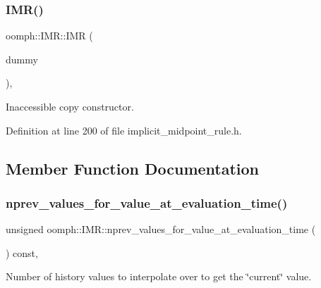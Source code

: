 \subsubsection{\texorpdfstring{I\+M\+R()}{IMR()}\hspace{0.1cm}{\footnotesize\ttfamily [2/2]}}
{\footnotesize\ttfamily oomph\+::\+I\+M\+R\+::\+I\+MR (\begin{DoxyParamCaption}\item[{const \hyperlink{classoomph_1_1IMR}{I\+MR} \&}]{dummy }\end{DoxyParamCaption})\hspace{0.3cm}{\ttfamily [inline]}, {\ttfamily [private]}}



Inaccessible copy constructor. 



Definition at line 200 of file implicit\+\_\+midpoint\+\_\+rule.\+h.



\subsection{Member Function Documentation}
\mbox{\label{classoomph_1_1IMR_a7cfe8ba542880aa524bcb837c1bc86e4}} 
\subsubsection{\texorpdfstring{nprev\+\_\+values\+\_\+for\+\_\+value\+\_\+at\+\_\+evaluation\+\_\+time()}{nprev\_values\_for\_value\_at\_evaluation\_time()}}
{\footnotesize\ttfamily unsigned oomph\+::\+I\+M\+R\+::nprev\+\_\+values\+\_\+for\+\_\+value\+\_\+at\+\_\+evaluation\+\_\+time (\begin{DoxyParamCaption}{ }\end{DoxyParamCaption}) const\hspace{0.3cm}{\ttfamily [inline]}, {\ttfamily [virtual]}}



Number of history values to interpolate over to get the \char`\"{}current\char`\"{} value. 



